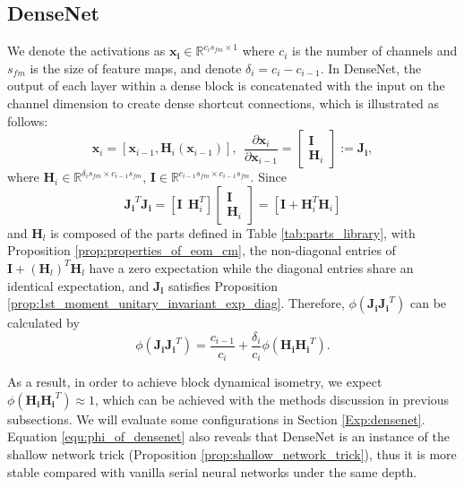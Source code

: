 \documentclass[10pt,journal,compsoc]{IEEEtran}
\begin{document}
\subsection{DenseNet}
We denote the activations as $\mathbf{x_i}\in \mathbb{R}^{c_is_{fm}\times 1}$ where $c_i$ is the number of channels and $s_{fm}$ is the size of feature maps, and denote $\delta_i = c_i - c_{i-1}$. In DenseNet\cite{huang2017densely}, the output of each layer within a dense block is concatenated with the input on the channel dimension to create dense shortcut connections, which is illustrated as follows:
\begin{equation}
    \mathbf{x}_i = \left[\mathbf{x}_{i-1}, \mathbf{H}_i\left(\mathbf{x}_{i-1}\right)\right],~~\frac{\partial \mathbf{x}_i}{\partial \mathbf{x}_{i-1}}={\left[\begin{array}{c}
     \mathbf{I} \\
     \mathbf{H}_i
\end{array}\right]} :=\mathbf{J_i},
\end{equation}
where $\mathbf{H}_i \in \mathbb{R}^{\delta_is_{fm}\times c_{i-1}s_{fm}}$, $\mathbf{I} \in \mathbb{R}^{c_{i-1}s_{fm}\times c_{i-1}s_{fm}}$. Since
\begin{equation}
    \mathbf{J_i}^T\mathbf{J_i} = \left[\mathbf{I}~~\mathbf{H}_i^T\right]{\left[\begin{array}{c}
     \mathbf{I} \\
     \mathbf{H}_i
\end{array}\right]} = \left[\mathbf{I} + \mathbf{H}_i^T\mathbf{H}_i \right]
\label{equ:densenet_JTJ}
\end{equation}
and $\mathbf{H}_l$ is composed of the parts defined in Table \ref{tab:parts_library}, with Proposition \ref{prop:properties_of_eom_cm}, the non-diagonal entries of $\mathbf{I} + \left(\mathbf{H}_l\right)^T\mathbf{H}_l$ have a zero expectation while the diagonal entries share an identical expectation, and $\mathbf{J_l}$ satisfies Proposition \ref{prop:1st_moment_unitary_invariant_exp_diag}. Therefore, $\phi(\mathbf{J_iJ_i}^T)$ can be calculated by
\begin{equation}
    \phi\left(\mathbf{J_iJ_i}^T\right) = \frac{c_{i-1}}{c_i} + \frac{\delta_i}{c_{i}}\phi\left(\mathbf{H_iH_i}^T\right).
\label{equ:phi_of_densenet}
\end{equation}

As a result, in order to achieve block dynamical isometry, we expect $\phi(\mathbf{H_iH_i}^T)\approx 1$, which can be achieved with the methods discussion in previous subsections. We will evaluate some configurations in Section \ref{Exp:densenet}. Equation \eqref{equ:phi_of_densenet} also reveals that DenseNet is an instance of the shallow network trick (Proposition \ref{prop:shallow_network_trick}), thus it is more stable compared with vanilla serial neural networks under the same depth.
 
\end{document}
